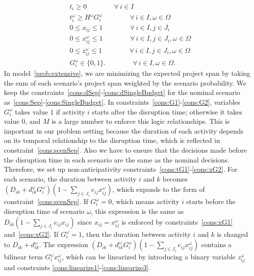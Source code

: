 \documentclass[11pt]{article}
\begin{document}
\begin{subequations}
\begin{align}
		& t_i \geq 0 \qquad \qquad \forall \,i \in I \label{cons:nonnegt}\\
		& t_i^\omega \geq H^\omega G_i^\omega \qquad \qquad \forall\, i \in I, \omega \in \Omega \\
		& 0 \leq x_{ij} \leq 1 \qquad \qquad \forall \,i \in I, j \in J_i\\ 
		& 0 \leq x_{ij}^\omega \leq 1 \qquad \qquad \forall \,i \in I, j \in J_i, \omega \in \Omega\\
		& 0 \leq z_{ij}^\omega \leq 1 \qquad \qquad \forall \,i \in I, j \in J_i, \omega \in \Omega\\
		& G_i^\omega \in \{0,1\}. \qquad \qquad \forall \,i \in I, \omega \in \Omega.
		\end{align}
	\end{subequations}
	In model~\eqref{prob:extensive}, we are minimizing the expected project span by taking the sum of each scenario's project span weighted by the scenario probability. We keep the constraints~\eqref{cons:dSep}-\eqref{cons:dSingleBudget} for the nominal scenario as~\eqref{cons:Sep}-\eqref{cons:SingleBudget}. In constraints~\eqref{cons:G1}-\eqref{cons:G2}, variables \(G^\omega_i\) takes value \(1\) if activity \(i\) starts after the disruption time; otherwise it takes value 0, and \(M\) is a large number to enforce this logic relationships. This is important in our problem setting because the duration of each activity depends on its temporal relationship to the disruption time, which is reflected in constraint~\eqref{cons:scenSep}. Also we have to ensure that the decisions made before the disruption time in each scenario are the same as the nominal decisions. Therefore, we set up non-anticipativity constraints~\eqref{cons:tG1}-\eqref{cons:xG2}. For each scenario, the duration between activity \(i\) and \(k\) becomes \((D_{ik} + d_{ik}^\omega G_i^\omega)(1 - \sum_{j \in J_i} e_{ij}x_{ij}^\omega)\), which expands to the form of constraint~\eqref{cons:scenSep}. If \(G_i^\omega = 0\), which means activity \(i\) starts before the disruption time of scenario \(\omega\), this expression is the same as \(D_{ik} (1 - \sum_{j \in J_i} e_{ij}x_{ij})\) since \(x_{ij} = x_{ij}^\omega\) is enforced by constraints~\eqref{cons:xG1} and~\eqref{cons:xG2}. If \(G_i^\omega = 1\), then the duration between activity \(i\) and \(k\) is changed to \(D_{ik} + d_{ik}^\omega\). The expression \((D_{ik} + d_{ik}^\omega G_i^\omega)(1 - \sum_{j \in J_i} e_{ij}x_{ij}^\omega)\) contains a bilinear term \(G_i^\omega x_{ij}^\omega\), which can be linearized by introducing a binary variable \(z_{ij}^\omega\) and constraints \eqref{cons:linearize1}-\eqref{cons:linearize3}.
	
\end{document}
